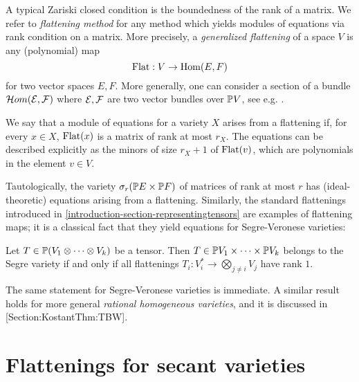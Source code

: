A typical Zariski closed condition is the boundedness of the rank of a matrix. We refer to \emph{flattening method} for any method which yields modules of equations via rank condition on a matrix. More precisely, a \emph{generalized flattening} of a space $V$ is any (polynomial) map 
\[
\mathrm{Flat} : V \to \operatorname{Hom} ( E,F)
\]
for two vector spaces $E,F$. More generally, one can consider a section of a bundle $\mathcal{H}om(\mathcal{E},\mathcal{F})$ where $\mathcal{E},\mathcal{F}$ are two vector bundles over $\mathbb{P} V$, see e.g. \cite{EH88}.

We say that a module of equations for a variety $X$ arises from a flattening if, for every $x \in X$, $\mathrm{Flat}(x)$ is a matrix of rank at most $r_X$. The equations can be described explicitly as the minors of size $r_X+1$ of $\mathrm{Flat}(v)$, which are polynomials in the element $v \in V$.

Tautologically, the variety $\sigma_r( \mathbb{P} E \times \mathbb{P} F)$ of matrices of rank at most $r$ has (ideal-theoretic) equations arising from a flattening. Similarly, the standard flattenings introduced in \ref{introduction-section-representingtensors} are examples of flattening maps; it is a classical fact that they yield equations for Segre-Veronese varieties:
\begin{proposition}
 \label{RepTheory-proposition-standardFlatrank1}
 Let $T \in \mathbb{P} (V_1 \otimes \cdots \otimes V_k)$ be a tensor. Then $T \in \mathbb{P} V_1 \times \cdots \times \mathbb{P} V_k$ belongs to the Segre variety if and only if all flattenings $T_i : V_i^* \to \bigotimes _{j \neq i} V_j$ have rank $1$.
\end{proposition}
The same statement for Segre-Veronese varieties is immediate. A similar result holds for more general \emph{rational homogeneous varieties}, and it is discussed in [Section:KostantThm:TBW].

\section{Flattenings for secant varieties}
\label{RepTheory-section-flatteningsSecants}

